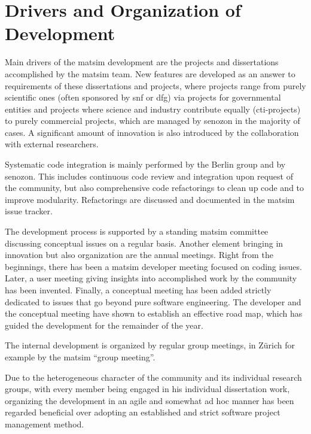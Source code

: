 \section{Drivers and Organization of Development}
Main drivers of the \gls{matsim} development are the projects and dissertations accomplished by the \gls{matsim} team. New features are developed as an answer to requirements of these dissertations and projects, where projects range 
%
from purely scientific ones (often sponsored by \gls{snf} or \gls{dfg}) 
%
via projects for governmental entities
%
and projects where science and industry contribute equally (\eg \gls{cti}-projects) 
%
to purely 
commercial projects, which are managed by \gls{senozon} in the majority of cases. 
%
A significant amount of innovation is also introduced by the collaboration with external researchers.

Systematic code integration is mainly performed by the Berlin group and by \gls{senozon}. 
This includes continuous code review and integration upon request of the community, but also comprehensive code refactorings to clean up
code and to 
improve modularity.  Refactorings are discussed and documented in the \gls{matsim} issue tracker.

The development process is supported by a standing \gls{matsim} committee discussing conceptual issues on a regular basis. 
Another element bringing in innovation but also organization are the annual meetings. 
Right from the beginnings, there has been a \gls{matsim} developer meeting focused on coding issues. 
Later, a user meeting giving insights into accomplished work by the community has been invented. 
Finally, a conceptual meeting has been added strictly dedicated to issues that go beyond pure software engineering. 
The developer and the conceptual meeting have shown to establish an effective road map, which has guided the development for the remainder of the year. 

The internal development is organized by regular group meetings, in Zürich for example by the \gls{matsim} ``group meeting''.

Due to the heterogeneous character of the community and its individual research groups, with every member being engaged in his individual dissertation work, organizing the development in an agile and somewhat ad hoc manner has been regarded beneficial over adopting an established and strict software project management method.

